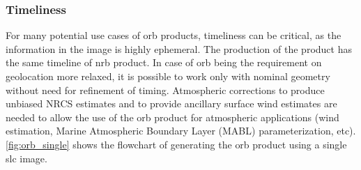 \subsubsection{Timeliness}
For many potential use cases of \acs{orb} products, timeliness can be critical, as the information in the image is highly ephemeral. The production of the product has the same timeline of \acs{nrb} product. In case of \acs{orb} being the requirement on geolocation more relaxed, it is possible to work only with nominal geometry without need for refinement of timing. Atmospheric corrections to produce unbiased NRCS estimates and to provide ancillary surface wind estimates are needed to allow the use of the \acs{orb} product for atmospheric applications (wind estimation, Marine Atmospheric Boundary Layer (MABL) parameterization, etc). \autoref{fig:orb_single} shows the flowchart of generating the \acs{orb} product using a single \acs{slc} image.
